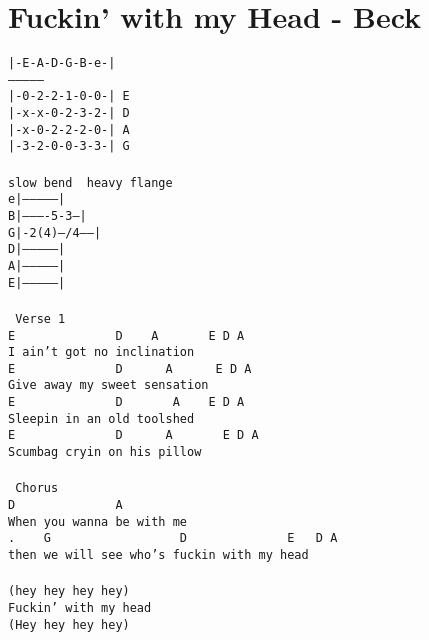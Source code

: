 \newpage
\section{Fuckin' with my Head - Beck}
\label{Fuckin' with my Head - Beck}
\texttt{|-E-A-D-G-B-e-|\\
---------------\\
|-0-2-2-1-0-0-|\ E\\
|-x-x-0-2-3-2-|\ D\\
|-x-0-2-2-2-0-|\ A\\
|-3-2-0-0-3-3-|\ G\\
\\
slow\ bend\ \ heavy\ flange\\
e|---------------|\\
B|----------5-3--|\\
G|-2(4)--/4------|\\
D|---------------|\\
A|---------------|\\
E|---------------|\\
\\
\lbrack\ Verse\ 1\rbrack\\
E\ \ \ \ \ \ \ \ \ \ \ \ \ \ D\ \ \ \ A\ \ \ \ \ \ \ E\ D\ A\\
I\ ain't\ got\ no\ inclination\\
E\ \ \ \ \ \ \ \ \ \ \ \ \ \ D\ \ \ \ \ \ A\ \ \ \ \ \ E\ D\ A\\
Give\ away\ my\ sweet\ sensation\\
E\ \ \ \ \ \ \ \ \ \ \ \ \ \ D\ \ \ \ \ \ \ A\ \ \ \ E\ D\ A\\
Sleepin\ in\ an\ old\ toolshed\\
E\ \ \ \ \ \ \ \ \ \ \ \ \ \ D\ \ \ \ \ \ A\ \ \ \ \ \ \ E\ D\ A\\
Scumbag\ cryin\ on\ his\ pillow\\
\\
\lbrack\ Chorus\rbrack\\
D\ \ \ \ \ \ \ \ \ \ \ \ \ \ A\\
When\ you\ wanna\ be\ with\ me\\
.\ \ \ \ G\ \ \ \ \ \ \ \ \ \ \ \ \ \ \ \ \ \ D\ \ \ \ \ \ \ \ \ \ \ \ \ \ E\ \ \ D\ A\\
then\ we\ will\ see\ who's\ fuckin\ with\ my\ head\\
\\
(hey\ hey\ hey\ hey)\\
Fuckin'\ with\ my\ head\\
(Hey\ hey\ hey\ hey)\\
}
